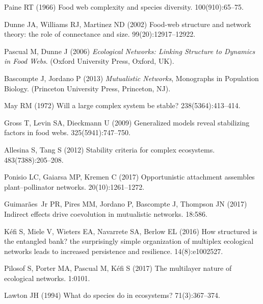 \documentclass[9pt,twocolumn,twoside]{pnas-new}
\begin{document}
% 

\begin{thebibliography}{10}

Paine RT (1966) Food web complexity and species diversity.
 100(910):65--75.

Dunne JA, Williams RJ, Martinez ND (2002) Food-web structure and network
  theory: the role of connectance and size.
 99(20):12917--12922.

Pascual M, Dunne J (2006) {\em Ecological Networks: Linking Structure to
  Dynamics in Food Webs}.
\newblock (Oxford University Press, Oxford, UK).

Bascompte J, Jordano P (2013) {\em Mutualistic Networks}, Monographs in
  Population Biology.
\newblock (Princeton University Press, Princeton, NJ).

May RM (1972) {Will a large complex system be stable?}
 238(5364):413--414.

Gross T, Levin SA, Dieckmann U (2009) Generalized models reveal stabilizing
  factors in food webs.
 325(5941):747--750.

Allesina S, Tang S (2012) {Stability criteria for complex ecosystems}.
 483(7388):205--208.

Ponisio LC, Gaiarsa MP, Kremen C (2017) Opportunistic attachment assembles
  plant–pollinator networks.
 20(10):1261--1272.

Guimar{\~a}es~Jr PR, Pires MM, Jordano P, Bascompte J, Thompson JN (2017)
  {Indirect effects drive coevolution in mutualistic networks}.
 18:586.

K{\'e}fi S, Miele V, Wieters EA, Navarrete SA, Berlow EL (2016) How structured
  is the entangled bank? the surprisingly simple organization of multiplex
  ecological networks leads to increased persistence and resilience.
 14(8):e1002527.

Pilosof S, Porter MA, Pascual M, K{\'e}fi S (2017) The multilayer nature of
  ecological networks.
 1:0101.

Lawton JH (1994) What do species do in ecosystems?
 71(3):367--374.


\end{thebibliography}
\end{document}
